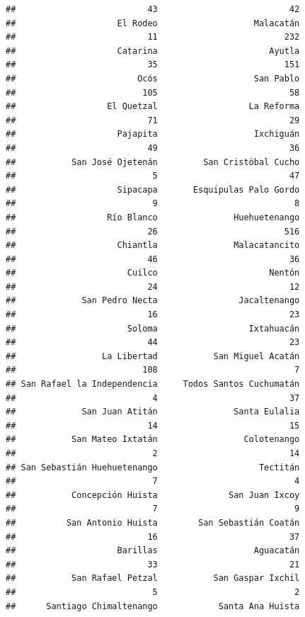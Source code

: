 \documentclass[
]{article}
\begin{document}
\begin{verbatim}
##                          43                          42 
##                    El Rodeo                   Malacatán 
##                          11                         232 
##                    Catarina                      Ayutla 
##                          35                         151 
##                        Ocós                   San Pablo 
##                         105                          58 
##                  El Quetzal                  La Reforma 
##                          71                          29 
##                    Pajapita                   Ixchiguán 
##                          49                          36 
##           San José Ojetenán         San Cristóbal Cucho 
##                           5                          47 
##                    Sipacapa       Esquipulas Palo Gordo 
##                           9                           8 
##                  Río Blanco               Huehuetenango 
##                          26                         516 
##                    Chiantla               Malacatancito 
##                          46                          36 
##                      Cuilco                      Nentón 
##                          24                          12 
##             San Pedro Necta                Jacaltenango 
##                          16                          23 
##                      Soloma                  Ixtahuacán 
##                          44                          23 
##                 La Libertad           San Miguel Acatán 
##                         108                           7 
## San Rafael la Independencia     Todos Santos Cuchumatán 
##                           4                          37 
##             San Juan Atitán               Santa Eulalia 
##                          14                          15 
##           San Mateo Ixtatán                 Colotenango 
##                           2                          14 
## San Sebastián Huehuetenango                    Tectitán 
##                           7                           4 
##           Concepción Huista              San Juan Ixcoy 
##                           7                           9 
##          San Antonio Huista        San Sebastián Coatán 
##                          16                          37 
##                    Barillas                   Aguacatán 
##                          33                          21 
##           San Rafael Petzal           San Gaspar Ixchil 
##                           5                           2 
##      Santiago Chimaltenango            Santa Ana Huista 

\end{verbatim}
\end{document}
